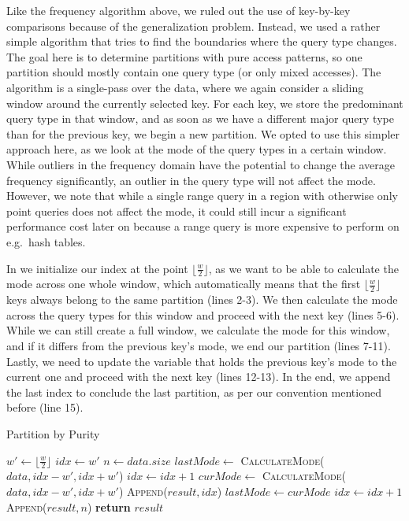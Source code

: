 Like the frequency algorithm above, we ruled out the use of key-by-key comparisons because of the generalization problem. Instead, we used a rather simple algorithm that tries to find the boundaries where the query type changes. The goal here is to determine partitions with pure access patterns, so one partition should mostly contain one query type (or only mixed accesses). The algorithm is a single-pass over the data, where we again consider a sliding window around the currently selected key. For each key, we store the predominant query type in that window, and as soon as we have a different major query type than for the previous key, we begin a new partition. We opted to use this simpler approach here, as we look at the mode of the query types in a certain window. While outliers in the frequency domain have the potential to change the average frequency significantly, an outlier in the query type will not affect the mode. However, we note that while a single range query in a region with otherwise only point queries does not affect the mode, it could still incur a significant performance cost later on because a range query is more expensive to perform on e.g.~hash tables.

In  we initialize our index at the point $\lfloor \frac{w}{2} \rfloor$, as we want to be able to calculate the mode across one whole window, which automatically means that the first $\lfloor \frac{w}{2} \rfloor$ keys always belong to the same partition (lines 2-3). We then calculate the mode across the query types for this window and proceed with the next key (lines 5-6). While we can still create a full window, we calculate the mode for this window, and if it differs from the previous key's mode, we end our partition (lines 7-11). Lastly, we need to update the variable that holds the previous key's mode to the current one and proceed with the next key (lines 12-13). In the end, we append the last index to conclude the last partition, as per our convention mentioned before (line 15).

\begin{algorithm}
\caption{Partition by Purity}\label{algo:purity}
\begin{algorithmic}[1]
    \State $w' \gets \lfloor \frac{w}{2} \rfloor$
    \State $idx \gets w'$
    \State $n \gets data.size$
    \State $lastMode \gets$ \textsc{CalculateMode}($data, idx - w', idx + w'$)
    \State $idx \gets idx + 1$
        \State $curMode \gets$ \textsc{CalculateMode}($data, idx - w', idx + w'$)
            \State \textsc{Append}($result, idx$)
        \EndIf
        \State $lastMode \gets curMode$
        \State $idx \gets idx + 1$
    \EndWhile
    \State \textsc{Append}($result, n$)
    \State \textbf{return} $result$
    \EndProcedure
\end{algorithmic}
\end{algorithm}

